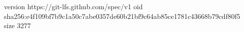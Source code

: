 version https://git-lfs.github.com/spec/v1
oid sha256:e4f109bf7b9c1a50c7abe0357de60b21bf9c64ab85ce1781c43668b79cdf80f5
size 3277
